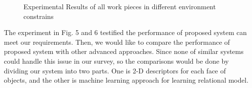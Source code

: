 \documentclass[journal]{IEEEtran}
\begin{document}
\begin{figure}[!t]
\centering


\caption{Experimental Results of all work pieces in different environment constrains}

\end{figure}

The experiment in Fig. 5 and 6 testified the performance of proposed system can meet our requirements. Then, we would like to compare the performance of proposed system with other advanced approaches. Since none of similar systems could handle this issue in our survey, so the comparisons would be done by dividing our system into two parts. One is 2-D descriptors for each face of objects, and the other is machine learning approach for learning relational model.
\end{document}

